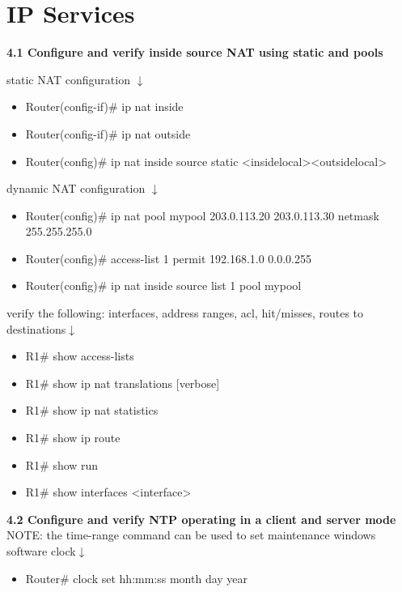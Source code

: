 \documentclass{article}
\begin{document}
\section{IP Services}
\noindent\textbf{4.1 Configure and verify inside source NAT using static and pools}

static NAT configuration $\downarrow$
\begin{itemize}
\item Router(config-if)\# ip nat inside
\item Router(config-if)\# ip nat outside
\item Router(config)\# ip nat inside source static \textless inside\-local\textgreater \textless outside\-local\textgreater
\end{itemize}

dynamic NAT configuration $\downarrow$
\begin{itemize}
\item Router(config)\# ip nat pool mypool 203.0.113.20 203.0.113.30 netmask 255.255.255.0
\item Router(config)\# access-list 1 permit 192.168.1.0 0.0.0.255
\item Router(config)\# ip nat inside source list 1 pool mypool
\end{itemize}

verify the following: interfaces, address ranges, acl, hit/misses, routes to destinations$\downarrow$
\begin{itemize}
\item R1\# show access-lists
\item R1\# show ip nat translations [verbose]
\item R1\# show ip nat statistics
\item R1\# show ip route
\item R1\# show run
\item R1\# show interfaces \textless interface\textgreater
\end{itemize}
		
\noindent\textbf{4.2 Configure and verify NTP operating in a client and server mode}\\

NOTE: the time-range command can be used to set maintenance windows\\
	
software clock$\downarrow$
\begin{itemize}
\item Router\# clock set hh:mm:ss month day year
\end{itemize}
		
\end{document}
